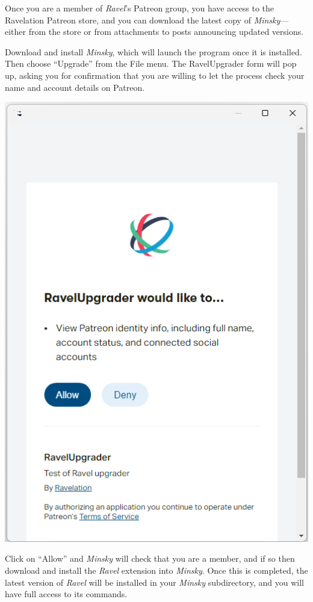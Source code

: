 Once you are a member of \emph{Ravel}'s Patreon group, you have access
to the Ravelation Patreon store, and you can download the latest copy
of \emph{Minsky}---either from the store or from attachments to posts
announcing updated versions.

Download and install \emph{Minsky}, which will launch the program
once it is installed. Then choose ``Upgrade'' from the File menu.
The RavelUpgrader form will pop up, asking you for confirmation that
you are willing to let the process check your name and account details
on Patreon.

\includegraphics{images/RavelUpgradeForm}

Click on ``Allow'' and \emph{Minsky} will check that you are a member,
and if so then download and install the \emph{Ravel} extension into
\emph{Minsky}. Once this is completed, the latest version of \emph{Ravel
}will be installed in your \emph{Minsky }subdirectory, and you will
have full access to its commands.

